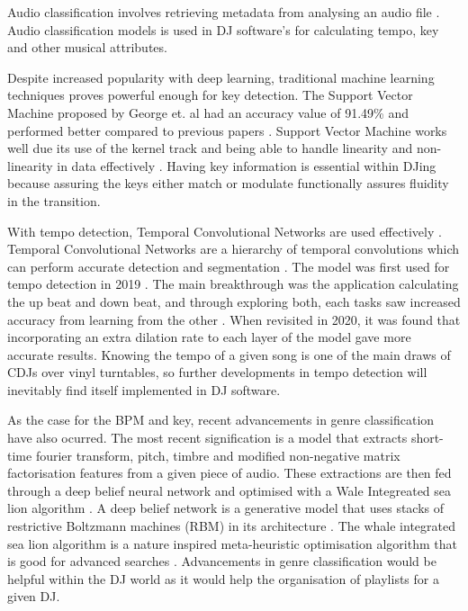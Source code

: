 Audio classification involves retrieving metadata from analysing an audio file \citep{sharma_audio_2021}. Audio classification models is used in DJ software's for calculating tempo, key and other musical attributes.

Despite increased popularity with deep learning, traditional machine learning techniques proves powerful enough for key detection. The Support Vector Machine proposed by George et. al had an accuracy value of 91.49\% and performed better compared to previous papers \citep{george_development_2022}. Support Vector Machine works well due its use of the kernel track and being able to handle linearity and non-linearity in data effectively \citep{hofmann_support_2006}. Having key information is essential within DJing because assuring the keys either match or modulate functionally assures fluidity in the transition. 

With tempo detection, Temporal Convolutional Networks are used effectively \citep{bock_deconstruct_2020}. Temporal Convolutional Networks are a hierarchy of temporal convolutions which can perform accurate detection and segmentation \citep{lea_temporal_2017}. The model was first used for tempo detection in 2019 \citep{bock_multi-task_2019}. The main breakthrough was the application  calculating the up beat and down beat, and through exploring both, each tasks saw increased accuracy from learning from the other \citep{bock_multi-task_2019}. When revisited in 2020, it was found that incorporating an extra dilation rate to each layer of the model gave more accurate results. Knowing the tempo of a given song is one of the main draws of CDJs over vinyl turntables, so further developments in tempo detection will inevitably find itself implemented in DJ software.

As the case for the BPM and key, recent advancements in genre classification have also ocurred. The most recent signification is a model that extracts short-time fourier transform, pitch, timbre and modified non-negative matrix factorisation features from a given piece of audio. These extractions are then fed through a deep belief neural network and optimised with a Wale Integreated sea lion algorithm \citep{kumaraswamy_optimal_2022}. A deep belief network is a generative model that uses stacks of restrictive Boltzmann machines (RBM) in its architecture \citep{canuma_what_2022}. The whale integrated sea lion algorithm is a nature inspired meta-heuristic optimisation algorithm that is good for advanced searches \citep{mirjalili_whale_2016}. Advancements in genre classification would be helpful within the DJ world as it would help the organisation of playlists for a given DJ.

